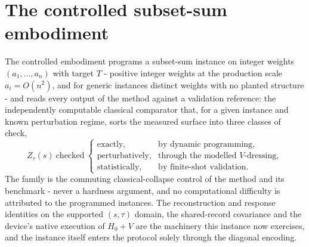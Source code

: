 \section{The controlled subset-sum embodiment}\label{sec:N5}

The controlled embodiment programs a subset-sum instance on integer weights $(a_1, \dots, a_n)$ with target $T$ - positive integer weights at the production scale $a_i = O(n^2)$, and for generic instances distinct weights with no planted structure - and reads every output of the method against a validation reference: the independently computable classical comparator that, for a given instance and known perturbation regime, sorts the measured surface into three classes of check,
\begin{equation}\label{def:answer-key}
Z_\tau(s)\ \text{checked}\
\begin{cases}
\text{exactly,} & \text{by dynamic programming},\\
\text{perturbatively,} & \text{through the modelled $V$-dressing},\\
\text{statistically,} & \text{by finite-shot validation}.
\end{cases}
\end{equation}
The family is the commuting classical-collapse control of the method and its benchmark - never a hardness argument, and no computational difficulty is attributed to the programmed instances. The reconstruction and response identities on the supported $(s, \tau)$ domain, the shared-record covariance and the device's native execution of $H_0 + V$ are the machinery this instance now exercises, and the instance itself enters the protocol solely through the diagonal encoding.

